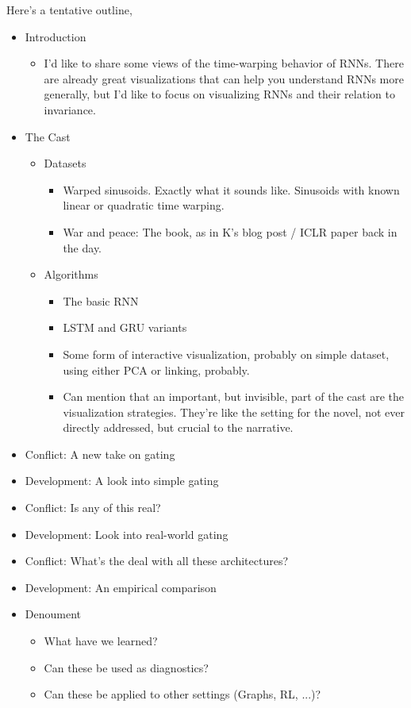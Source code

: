\documentclass{article}
\begin{document}
Here's a tentative outline,

\begin{itemize}
\item Introduction
  \begin{itemize}
    \item I'd like to share some views of the time-warping behavior of RNNs.
      There are already great visualizations that can help you understand RNNs
      more generally, but I'd like to focus on visualizing RNNs and their
      relation to invariance.
  \end{itemize}
\item The Cast
  \begin{itemize}
  \item Datasets
    \begin{itemize}
    \item Warped sinusoids. Exactly what it sounds like. Sinusoids with known
      linear or quadratic time warping.
    \item War and peace: The book, as in K's blog post / ICLR paper back in the
      day.
    \end{itemize}
  \item Algorithms
    \begin{itemize}
    \item The basic RNN
    \item LSTM and GRU variants
    \item Some form of interactive visualization, probably on simple dataset,
      using either PCA or linking, probably.
    \item Can mention that an important, but invisible, part of the cast are the
      visualization strategies. They're like the setting for the novel, not ever
      directly addressed, but crucial to the narrative.
    \end{itemize}
  \end{itemize}
\item Conflict: A new take on gating
\item Development: A look into simple gating
\item Conflict: Is any of this real?
\item Development: Look into real-world gating
\item Conflict: What's the deal with all these architectures?
\item Development: An empirical comparison
\item Denoument
  \begin{itemize}
  \item What have we learned?
  \item Can these be used as diagnostics?
  \item Can these be applied to other settings (Graphs, RL, ...)?
  \end{itemize}
\end{itemize}
\end{document}
